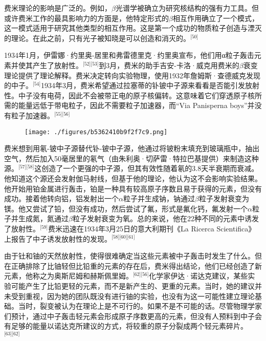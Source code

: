 费米理论的影响是广泛的。例如，$\beta$光谱学被确立为研究核结构的强有力工具。但或许费米工作的最具影响力的方面是，他特定形式的$\beta$相互作用确立了一个模式，这一模式适用于研究其他类型的相互作用。这是第一个成功的物质粒子创造与湮灭的理论。在此之前，只有光子被知晓是可以创造和消灭的。\(^\text{[50]}\)

1934年1月，伊雷娜·约里奥-居里和弗雷德里克·约里奥宣布，他们用α粒子轰击元素并使其产生了放射性。\(^\text{[52][53]}\)到3月，费米的助手吉安-卡洛·威克用费米的$\beta$衰变理论提供了理论解释。费米决定转向实验物理，使用1932年詹姆斯·查德威克发现的中子。\(^\text{[54]}\)1934年3月，费米希望通过拉塞蒂的钋铍中子源来看看是否能引发放射性。中子没有电荷，因此不会被带正电的原子核偏转。这意味着它们穿透原子核所需的能量远低于带电粒子，因此不需要粒子加速器，而“Via Panisperna boys”并没有粒子加速器。\(^\text{[55][56]}\)
\begin{figure}[ht]
\centering
\texttt{[image: ./figures/b5362410b9f2f7c9.png]}
\caption{} \label{fig_ELK_5}
\end{figure}
费米想到用氡-铍中子源替代钋-铍中子源，他通过将铍粉末填充到玻璃瓶中，抽出空气，然后加入50毫居里的氡气（由朱利奥·切萨雷·特拉巴基提供）来制造这种源。\(^\text{[57][58]}\)这创造了一个更强的中子源，但其有效性随着氡的3.8天半衰期而衰减。他知道这个源还会发射伽马射线，但基于他的理论，他认为这不会影响实验结果。他开始用铂金属进行轰击，铂是一种具有较高原子序数且易于获得的元素，但没有成功。接着他转向铝，铝发射出一个$\alpha$粒子并生成钠，钠通过$\beta$粒子发射衰变为镁。他又尝试了铅，但没有成功，然后尝试了氟，形式是氟化钙，氟发射一个$\alpha$粒子并生成氮，氮通过$\beta$粒子发射衰变为氧。总的来说，他在22种不同的元素中诱发了放射性。\(^\text{[59]}\)费米迅速在1934年3月25日的意大利期刊《La Ricerca Scientifica》上报告了中子诱发放射性的发现。\(^\text{[58][60][61]}\)

由于钍和铀的天然放射性，使得很难确定当这些元素被中子轰击时发生了什么。但在正确排除了比铀轻但比铅重的元素的存在后，费米得出结论，他们已经创造了新元素，他称之为奥斯尼姆和赫斯佩里姆。\(^\text{[62][56]}\)化学家伊达·诺达克建议，某些实验可能产生了比铅更轻的元素，而不是新产生的、更重的元素。当时，她的建议并未受到重视，因为她的团队既没有进行铀的实验，也没有为这一可能性建立理论基础。当时，裂变被认为在理论上是不可行的。如果不是不可能的话。尽管物理学家们预计，通过中子轰击轻元素会形成原子序数更高的元素，但没有人预料到中子会有足够的能量以诺达克所建议的方式，将较重的原子分裂成两个轻元素碎片。\(^\text{[63][62]}\)
